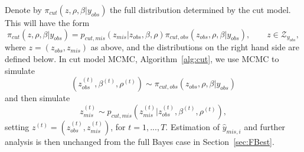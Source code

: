 \documentclass{article}
\begin{document}
Denote by $\pi_{cut}(z, \rho, \beta | y_{obs} )$ the full distribution determined by the cut model.
This will have the form
\begin{equation}\label{eq:fcp}
\pi_{cut}(z, \rho, \beta | y_{obs} )=p_{cut,mis}(z_{mis}|z_{obs},\beta,\rho)\pi_{cut,obs}(z_{obs}, \rho, \beta | y_{obs} ),\qquad z\in \mathcal{Z}_{y_{obs}},
\end{equation}
where $z=(z_{obs}, z_{mis})$ as above, and the distributions on the right hand side are defined below. In cut model MCMC, Algorithm~\ref{alg:cut}, we use MCMC to simulate
\[(z^{(t)}_{obs},\beta^{(t)},\rho^{(t)})\sim \pi_{cut,obs}(z_{obs}, \rho, \beta | y_{obs} )\]
and then simulate
\[
z^{(t)}_{mis}\sim p_{cut,mis}(z^{(t)}_{mis}|z^{(t)}_{obs},\beta^{(t)},\rho^{(t)}),
\]
setting $z^{(t)}=(z^{(t)}_{obs},z^{(t)}_{mis})$, for $t=1,...,T$. Estimation of $\hat y_{mis,i}$ and further analysis is then
unchanged from the full Bayes case in Section~\ref{sec:FBest}.

\end{document}
